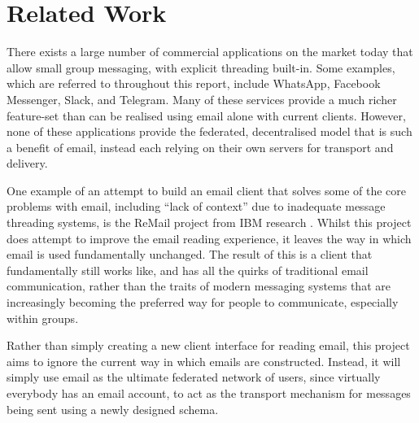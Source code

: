 \chapter{Related Work}


There exists a large number of commercial applications on the market today that allow small group messaging, with explicit threading built-in. Some examples, which are referred to throughout this report, include WhatsApp, Facebook Messenger, Slack, and Telegram. Many of these services provide a much richer feature-set than can be realised using email alone with current clients. However, none of these applications provide the federated, decentralised model that is such a benefit of email, instead each relying on their own servers for transport and delivery.

One example of an attempt to build an email client that solves some of the core problems with email, including ``lack of context'' due to inadequate message threading systems, is the ReMail project from IBM research \cite{kerr2004designing}. Whilst this project does attempt to improve the email reading experience, it leaves the way in which email is used fundamentally unchanged. The result of this is a client that fundamentally still works like, and has all the quirks of traditional email communication, rather than the traits of modern messaging systems that are increasingly becoming the preferred way for people to communicate, especially within groups.

Rather than simply creating a new client interface for reading email, this project aims to ignore the current way in which emails are constructed. Instead, it will simply use email as the ultimate federated network of users, since virtually everybody has an email account, to act as the transport mechanism for messages being sent using a newly designed schema.